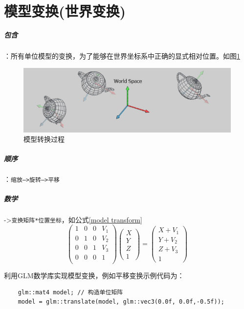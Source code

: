 \documentclass[UTF8,a4paper,12pt]{ctexbook}
\begin{document}
	\section{模型变换(世界变换)}
			\subparagraph{包含}：所有单位模型的变换，为了能够在世界坐标系中正确的显式相对位置。如图\ref{mxzh}
				\begin{figure}[htbp]
					\centering
					\includegraphics[scale = 0.7]{transferModel.png}
					\caption{模型转换过程}
					\label{mxzh}
				\end{figure}
			
			\subparagraph{顺序}：\verb|缩放–>旋转—>平移|
		
			\subparagraph{数学}->\verb|变换矩阵*位置坐标|，如公式\ref{model transform}
					\begin{equation}\label{model transform}
					\left(
					\begin{array}{cccc}
					1 & 0 & 0& V_1\\
					
					0 & 1 & 0& V_2\\
					
					0 & 0 & 1& V_3\\
					
					0 & 0 & 0& 1\\
					\end{array}
					\right)
					\left(
					\begin{array}{c}
					X\\ 
					Y\\
					Z\\
					1 
					\end{array}	
					\right) 
					=
					\left(
					\begin{array}{c}
					X+V_1\\ 
					Y+V_2\\
					Z+V_3\\
					1 
					\end{array}	
					\right)
					\end{equation}
		
		
			利用GLM数学库实现模型变换，例如平移变换示例代码为：
			\begin{lstlisting}
	glm::mat4 model; // 构造单位矩阵
	model = glm::translate(model, glm::vec3(0.0f, 0.0f,-0.5f));
			\end{lstlisting}
			
\end{document}
